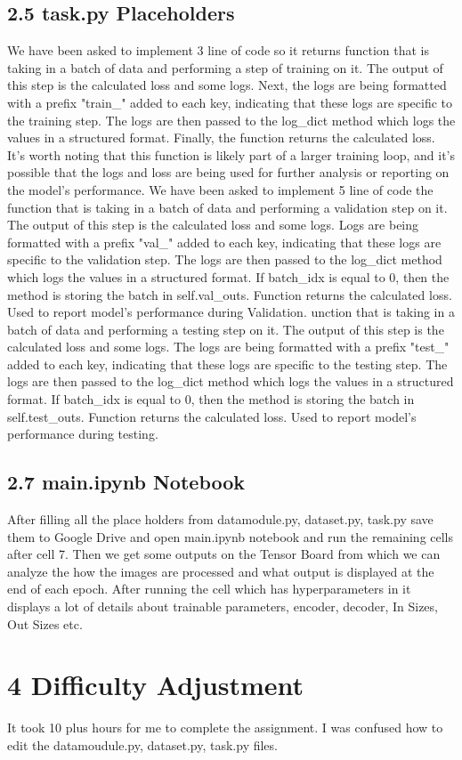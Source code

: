 \documentclass{article}
\begin{document}
 \subsection*{2.5 task.py Placeholders}
 \newline We have been asked to implement 3 line of code so it returns function that is taking in a batch of data and performing a step of training on it. The output of this step is the calculated loss and some logs.
 Next, the logs are being formatted with a prefix "train\_" added to each key, indicating that these logs are specific to the training step. The logs are then passed to the log\_dict method which logs the values in a structured format.
 Finally, the function returns the calculated loss. It's worth noting that this function is likely part of a larger training loop, and it's possible that the logs and loss are being used for further analysis or reporting on the model's performance.
 \newline We have been asked to implement 5 line of code the function that is taking in a batch of data and performing a validation step on it. The output of this step is the calculated loss and some logs. Logs are being formatted with a prefix "val\_" added to each key, indicating that these logs are specific to the validation step. The logs are then passed to the log\_dict method which logs the values in a structured format. If batch\_idx is equal to 0, then the method is storing the batch in self.val\_outs. Function returns the calculated loss. Used to report model's performance during Validation.
 \newline unction that is taking in a batch of data and performing a testing step on it. The output of this step is the calculated loss and some logs.
 The logs are being formatted with a prefix "test\_" added to each key, indicating that these logs are specific to the testing step. The logs are then passed to the log\_dict method which logs the values in a structured format.
 If batch\_idx is equal to 0, then the method is storing the batch in self.test\_outs. Function returns the calculated loss. Used to report model's performance during testing.

 \subsection*{2.7 main.ipynb Notebook}
 \newline After filling all the place holders from datamodule.py, dataset.py, task.py save them to Google Drive and open main.ipynb notebook and run the remaining cells after cell 7. Then we get some outputs on the Tensor Board from which we can analyze the how the images are processed and what output is displayed at the end of each epoch.
 After running the cell which has hyperparameters in it displays a lot of  details about trainable parameters, encoder, decoder, In Sizes, Out Sizes etc.  
  \section*{4 Difficulty Adjustment}
  \newline It took 10 plus hours for me to complete the assignment.
  \newline I was confused how to edit the datamoudule.py, dataset.py, task.py files.
\end{document}
